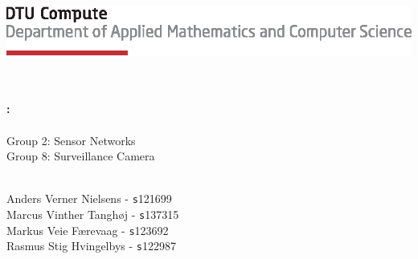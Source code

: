 
\begin{titlepage}
\null
\includegraphics[scale=1]{figures/tex_dtu_compute_a_uk}\\[10pt]
\addtolength{\wpXoffset}{-6cm}
\addtolength{\wpYoffset}{-10cm}


{\huge\bfseries \COURSE}\\\ \\
{\LARGE\bfseries \TITLE:}\\\ \\
Group 2: Sensor Networks\\
Group 8: Surveillance Camera\\
\ \\
{\DATE}

\vspace{140pt}

Anders Verner Nielsens - {\texttt s121699}\\
Marcus Vinther Tanghøj - {\texttt s137315}\\
Markus Veie Færevaag - {\texttt s123692}\\
Rasmus Stig Hvingelbys - {\texttt s122987} \\
\\
[3cm]
\end{titlepage}

\newpage
